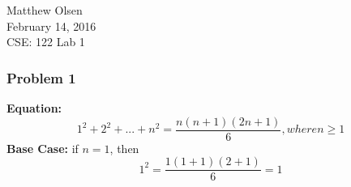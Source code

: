 \documentclass[a4paper,12pt]{article}
\begin{document}
\begin{flushright}
Matthew Olsen\\
February 14, 2016\\ 
CSE: 122 Lab 1\\
\end{flushright}

\subsubsection{Problem 1}
	\textbf{Equation:}\\
	\begin{equation*}
		1^2 + 2^2 + ... + n^2 = \frac{n(n + 1)(2n + 1)}{6}, where n\geq1
	\end{equation*}
	\textbf{Base Case:} if $n = 1$, then
	\begin{equation*}
		1^2 = \frac{1(1 + 1)(2 + 1)}{6} = 1
	\end{equation*}
\end{document}
